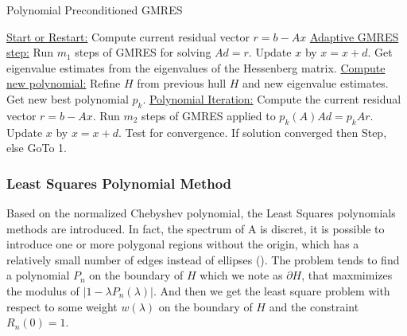 \begin{algorithm}[htbp]
	\caption{Polynomial Preconditioned GMRES}
	\label{alg:hybrid-gmres}
	\begin{algorithmic}[1]
		\State \underline{Start or Restart:}
		\State \hspace{16pt} Compute current residual vector $r=b-Ax$
		\State \underline{Adaptive GMRES step:}
		\State \hspace{16pt} Run $m_1$ steps of GMRES for solving $Ad = r$.
		\State \hspace{16pt} Update $x$ by $x=x+d$.
		\State \hspace{16pt} Get eigenvalue estimates from the eigenvalues of the Hessenberg matrix.
		\State \underline{Compute new polynomial:}
		\State \hspace{16pt} Refine $H$ from previous hull $H$ and new eigenvalue estimates.
		\State \hspace{16pt} Get new best polynomial $p_k$.
		\State \underline{Polynomial Iteration:}
		\State \hspace{16pt} Compute the current residual vector $r= b-Ax$.
		\State \hspace{16pt} Run $m_2$ steps of GMRES applied to $p_k(A)Ad=p_k{A}r$.
		\State \hspace{16pt} Update $x$ by $x=x+d$.
		\State \hspace{16pt} Test for convergence.
		\State \hspace{16pt} If solution converged then Step, else GoTo 1.
	\end{algorithmic}
\end{algorithm}

\subsubsection{Least Squares Polynomial Method}

Based on the normalized Chebyshev polynomial, the Least Squares polynomials methods are introduced. In fact, the spectrum of A is discret, it is possible to introduce one or more polygonal regions without the origin, which has a relatively small number of edges instead of ellipses (\cite{smolarski1982optimum}). The problem tends to find a polynomial \(P_n\) on the boundary of \(H\) which we note as \(\partial H\), that maxmimizes the modulus of \(|1-\lambda P_n(\lambda)|\). And then we get the least square problem with respect to some weight \(w(\lambda)\) on the boundary of \(H\) and the constraint \(R_n(0)=1\).

